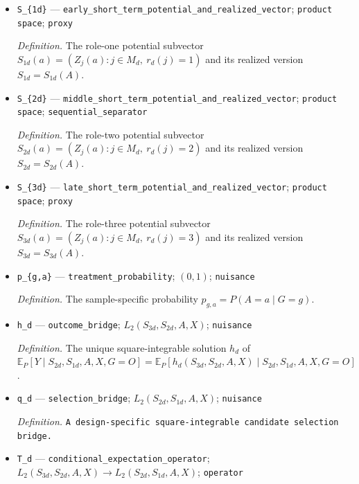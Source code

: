 \documentclass{article}
\begin{document}
\begin{itemize}
  \item \texttt{S\_\allowbreak{}\{1d\}\allowbreak{}} --- \texttt{early\_\allowbreak{}short\_\allowbreak{}term\_\allowbreak{}potential\_\allowbreak{}and\_\allowbreak{}realized\_\allowbreak{}vector}; \texttt{product space}; \texttt{proxy}
  \par\smallskip\noindent\emph{Definition.} The role-one potential subvector \(S_{1d}(a)=(Z_j(a):j\in M_d,\ r_d(j)=1)\) and its realized version \(S_{1d}=S_{1d}(A)\).
  \item \texttt{S\_\allowbreak{}\{2d\}\allowbreak{}} --- \texttt{middle\_\allowbreak{}short\_\allowbreak{}term\_\allowbreak{}potential\_\allowbreak{}and\_\allowbreak{}realized\_\allowbreak{}vector}; \texttt{product space}; \texttt{sequential\_\allowbreak{}separator}
  \par\smallskip\noindent\emph{Definition.} The role-two potential subvector \(S_{2d}(a)=(Z_j(a):j\in M_d,\ r_d(j)=2)\) and its realized version \(S_{2d}=S_{2d}(A)\).
  \item \texttt{S\_\allowbreak{}\{3d\}\allowbreak{}} --- \texttt{late\_\allowbreak{}short\_\allowbreak{}term\_\allowbreak{}potential\_\allowbreak{}and\_\allowbreak{}realized\_\allowbreak{}vector}; \texttt{product space}; \texttt{proxy}
  \par\smallskip\noindent\emph{Definition.} The role-three potential subvector \(S_{3d}(a)=(Z_j(a):j\in M_d,\ r_d(j)=3)\) and its realized version \(S_{3d}=S_{3d}(A)\).
  \item \texttt{p\_\allowbreak{}\{g,\allowbreak{}a\}\allowbreak{}} --- \texttt{treatment\_\allowbreak{}probability}; \((0,1)\); \texttt{nuisance}
  \par\smallskip\noindent\emph{Definition.} The sample-specific probability \(p_{g,a}=P(A=a\mid G=g)\).
  \item \texttt{h\_\allowbreak{}d} --- \texttt{outcome\_\allowbreak{}bridge}; \(L_2(S_{3d},S_{2d},A,X)\); \texttt{nuisance}
  \par\smallskip\noindent\emph{Definition.} The unique square-integrable solution \(h_d\) of \(\mathbb E_P[Y\mid S_{2d},S_{1d},A,X,G=O]=\mathbb E_P[h_d(S_{3d},S_{2d},A,X)\mid S_{2d},S_{1d},A,X,G=O]\).
  \item \texttt{q\_\allowbreak{}d} --- \texttt{selection\_\allowbreak{}bridge}; \(L_2(S_{2d},S_{1d},A,X)\); \texttt{nuisance}
  \par\smallskip\noindent\emph{Definition.} \texttt{A design-\allowbreak{}specific square-\allowbreak{}integrable candidate selection bridge.}
  \item \texttt{T\_\allowbreak{}d} --- \texttt{conditional\_\allowbreak{}expectation\_\allowbreak{}operator}; \(L_2(S_{3d},S_{2d},A,X)\to L_2(S_{2d},S_{1d},A,X)\); \texttt{operator}

\end{itemize}
\end{document}
